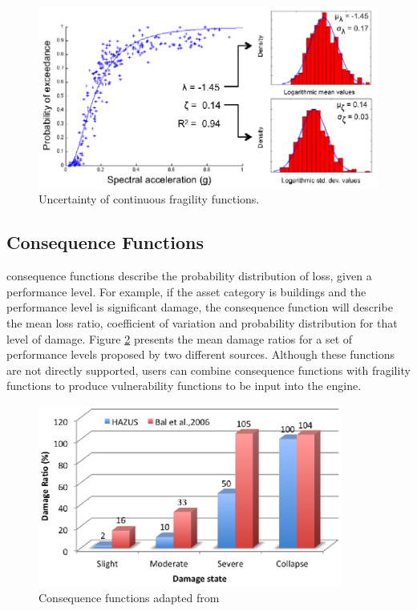 \begin{figure}[ht]
\centering
\includegraphics[width=12cm,height=6cm]{./figures/risk/FFuncertainty.eps}
\caption{Uncertainty of continuous fragility functions.}
\label{fig:FF_uncertainty}
\end{figure}


\subsection{Consequence Functions}
\Glspl{consequence function} describe the probability distribution of loss, given a performance level. For example, if the asset category is buildings and the performance level is significant damage, the \gls{consequence function} will describe the mean loss ratio, coefficient of variation and probability distribution for that level of damage. Figure \ref{fig:ConsequenceFunctions} presents the mean damage ratios for a set of performance levels proposed by two different sources. Although these functions are not directly supported, users can combine \glspl{consequence function} with \glspl{fragility function} to produce \glspl{vulnerability function} to be input into the engine.  

\begin{figure}[Ht]
\centering
\includegraphics[width=10cm,height=6cm]{./figures/risk/ConsequenceFunction.eps}
\caption{Consequence functions adapted from  \citet{Baletal2010}}
\label{fig:ConsequenceFunctions}
\end{figure}
\color{black}
